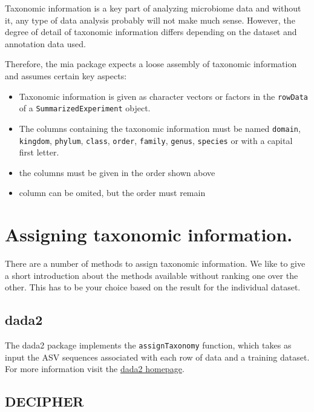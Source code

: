 \documentclass[
]{book}
\providecommand{\tightlist}{%
  \setlength{\itemsep}{0pt}\setlength{\parskip}{0pt}}
\begin{document}
Taxonomic information is a key part of analyzing microbiome data and without
it, any type of data analysis probably will not make much sense. However,
the degree of detail of taxonomic information differs depending on the dataset
and annotation data used.

Therefore, the mia package expects a loose assembly of taxonomic information
and assumes certain key aspects:

\begin{itemize}
\tightlist
\item
  Taxonomic information is given as character vectors or factors in the
  \texttt{rowData} of a \texttt{SummarizedExperiment} object.
\item
  The columns containing the taxonomic information must be named \texttt{domain},
  \texttt{kingdom}, \texttt{phylum}, \texttt{class}, \texttt{order}, \texttt{family}, \texttt{genus}, \texttt{species} or with
  a capital first letter.
\item
  the columns must be given in the order shown above
\item
  column can be omited, but the order must remain
\end{itemize}

\hypertarget{assigning-taxonomic-information.}{%
\section{Assigning taxonomic information.}\label{assigning-taxonomic-information.}}

There are a number of methods to assign taxonomic information. We like to give
a short introduction about the methods available without ranking one over the
other. This has to be your choice based on the result for the individual
dataset.

\hypertarget{dada2}{%
\subsection{dada2}\label{dada2}}

The dada2 package \citep{Callahan2016dada2} implements the \texttt{assignTaxonomy}
function, which takes as input the ASV sequences associated with each
row of data and a training dataset. For more information visit the
\href{https://benjjneb.github.io/dada2/assign.html}{dada2 homepage}.

\hypertarget{decipher}{%
\subsection{DECIPHER}\label{decipher}}
\end{document}
